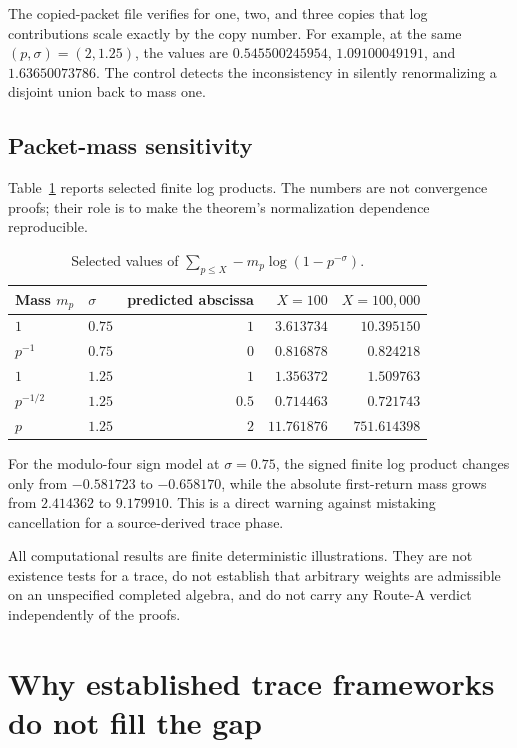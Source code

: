 \documentclass[11pt]{article}
\theoremstyle{definition}
\theoremstyle{remark}
\begin{document}
The copied-packet file verifies for one, two, and three copies that log
contributions scale exactly by the copy number.  For example, at the same
\((p,\sigma)=(2,1.25)\), the values are
\(0.545500245954\), \(1.09100049191\), and \(1.63650073786\).
The control detects the inconsistency in silently renormalizing a disjoint
union back to mass one.

\subsection{Packet-mass sensitivity}

Table~\ref{tab:sensitivity} reports selected finite log products.  The numbers
are not convergence proofs; their role is to make the theorem's normalization
dependence reproducible.

\begin{table}[ht]
\centering
\caption{Selected values of
\(\sum_{p\le X}-m_p\log(1-p^{-\sigma})\).}
\label{tab:sensitivity}
\begin{tabular}{llrrr}
\toprule
Mass \(m_p\) & \(\sigma\) & predicted abscissa &
\(X=100\) & \(X=100{,}000\)\\
\midrule
\(1\)        & \(0.75\) & \(1\)   & \(3.613734\) & \(10.395150\)\\
\(p^{-1}\)   & \(0.75\) & \(0\)   & \(0.816878\) & \(0.824218\)\\
\(1\)        & \(1.25\) & \(1\)   & \(1.356372\) & \(1.509763\)\\
\(p^{-1/2}\) & \(1.25\) & \(0.5\) & \(0.714463\) & \(0.721743\)\\
\(p\)        & \(1.25\) & \(2\)   & \(11.761876\)& \(751.614398\)\\
\bottomrule
\end{tabular}
\end{table}

For the modulo-four sign model at \(\sigma=0.75\), the signed finite log
product changes only from \(-0.581723\) to \(-0.658170\), while the absolute
first-return mass grows from \(2.414362\) to \(9.179910\).  This is a direct
warning against mistaking cancellation for a source-derived trace phase.

All computational results are finite deterministic illustrations.  They are
not existence tests for a trace, do not establish that arbitrary weights are
admissible on an unspecified completed algebra, and do not carry any Route-A
verdict independently of the proofs.

\section{Why established trace frameworks do not fill the gap}
\label{sec:frameworks}
\end{document}
